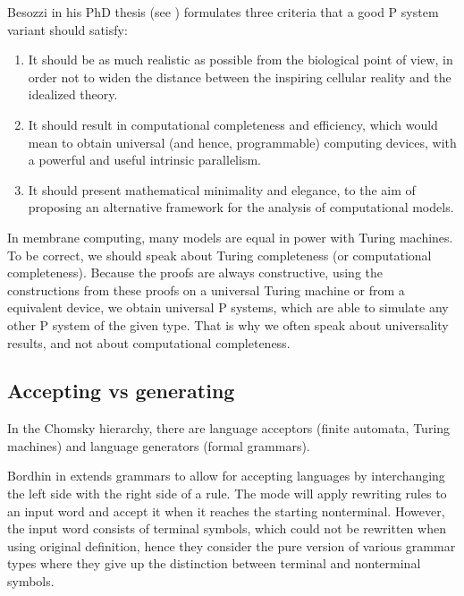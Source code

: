 Besozzi in his PhD thesis (see \cite{Besozzi:PhD:2004}) formulates three criteria that a good P system variant should satisfy:

\begin{enumerate}
	\item It should be as much realistic as possible from the biological point of view, in order not to widen the distance between the inspiring cellular reality and the idealized theory.
	\item It should result in computational completeness and efficiency, which would mean to obtain universal (and hence, programmable) computing devices, with a powerful and useful intrinsic parallelism.
	\item It should present mathematical minimality and elegance, to the aim of proposing an alternative framework for the analysis of computational models.
\end{enumerate}

In membrane computing, many models are equal in power with Turing machines. To be correct, we should speak about Turing completeness (or computational completeness). Because the proofs are always constructive, using the constructions from these proofs on a universal Turing machine or from a equivalent device, we obtain universal P systems, which are able to simulate any other P system of the given type. That is why we often speak about universality results, and not about computational completeness.

\subsection{Accepting vs generating} %
\label{sub:accepting_vs_generating}

In the Chomsky hierarchy, there are language acceptors (finite automata, Turing machines) and language generators (formal grammars).


Bordhin in \cite{Bordihn99acceptingpure} extends grammars to allow for accepting languages by interchanging the left side with the right side of a rule. The mode will apply rewriting rules to an input word and accept it when it reaches the starting nonterminal. However, the input word consists of terminal symbols, which could not be rewritten when using original definition, hence they consider the pure version of various grammar types where they give up the distinction between terminal and nonterminal symbols.


